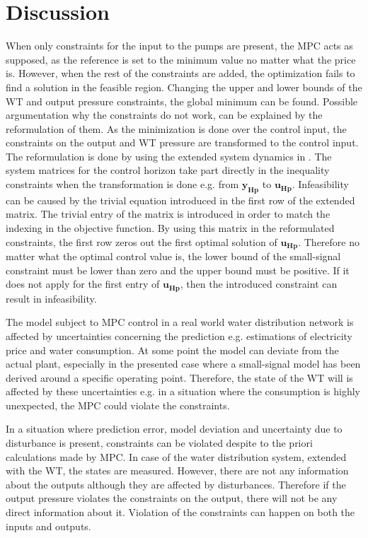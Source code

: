 \chapter{Discussion}
\label{Discussion}

When only constraints for the input to the pumps are present, the MPC acts as supposed, as the reference is set to the minimum value no matter what the price is. However, when the rest of the constraints are added, the optimization fails to find a solution in the feasible region. Changing the upper and lower bounds of the WT and output pressure constraints, the global minimum can be found. 
Possible argumentation why the constraints do not work, can be explained by the reformulation of them. As the minimization is done over the control input, the constraints on the output and WT pressure are transformed to the control input. The reformulation is done by using the extended system dynamics in . The system matrices for the control horizon take part directly in the inequality constraints when the transformation is done e.g. from $\bm{y_{Hp}}$ to $\bm{u_{Hp}}$. Infeasibility can be caused by the trivial equation introduced in the first row of the extended matrix. The trivial entry of the matrix is introduced in order to match the indexing in the objective function. By using this matrix in the reformulated constraints, the first row zeros out the first optimal solution of $\bm{u_{Hp}}$. Therefore no matter what the optimal control value is, the lower bound of the small-signal constraint must be lower than zero and the upper bound must be positive. If it does not apply for the first entry of $\bm{u_{Hp}}$, then the introduced constraint can result in infeasibility. 

The model subject to MPC control in a real world water distribution network is affected by uncertainties concerning the prediction e.g. estimations of electricity price and water consumption. At some point the model can deviate from the actual plant, especially in the presented case where a small-signal model has been derived around a specific operating point. Therefore, the state of the WT will is affected by these uncertainties e.g. in a situation where the consumption is highly unexpected, the MPC could violate the constraints.

In a situation where prediction error, model deviation and uncertainty due to disturbance is present, constraints can be violated despite to the priori calculations made by MPC. In case of the water distribution system, extended with the WT, the states are measured. However, there are not any information about the outputs although they are affected by disturbances. Therefore if the output pressure violates the constraints on the output, there will not be any direct information about it. Violation of the constraints can happen on both the inputs and outputs.

